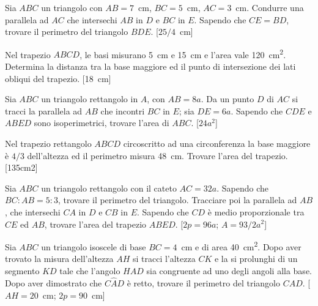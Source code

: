 \begin{multicols}{2}

\begin{esercizio}
\label{ese:7.10}
Sia $ABC$ un triangolo con $AB=7$~cm, $BC=5$~cm, $AC=3$~cm. Condurre una parallela ad $AC$ che intersechi $AB$ in $D$ e $BC$ in $E$. Sapendo che $CE=BD$, trovare il perimetro del triangolo $BDE$. 	[$25/4$~cm]
\end{esercizio}

\begin{esercizio}
\label{ese:7.11}
Nel trapezio $ABCD$, le basi misurano 5~cm e 15~cm e l'area vale 120~cm\textsuperscript{2}. Determina la distanza tra la base maggiore ed il punto di intersezione dei lati obliqui del trapezio. 		[18~cm]
\end{esercizio}

\begin{esercizio}
\label{ese:7.12}
Sia $ABC$ un triangolo rettangolo in $A$, con $AB=8a$. Da un punto $D$ di $AC$ si tracci la parallela ad $AB$ che incontri $BC$ in $E$; sia $DE=6a$. Sapendo che $CDE$ e $ABED$ sono isoperimetrici, trovare l'area di $ABC$.   [$24a^2$]
\end{esercizio}

\begin{esercizio}
\label{ese:7.13}
Nel trapezio rettangolo $ABCD$ circoscritto ad una circonferenza  la base maggiore è $4/3$ dell'altezza ed il perimetro misura 48~cm. Trovare l'area del trapezio.              		[135cm2]
\end{esercizio}

\begin{esercizio}
\label{ese:7.14}
Sia $ABC$ un triangolo rettangolo con il cateto $AC = 32a$. Sapendo che $BC:AB=5:3$, trovare il perimetro del triangolo. Tracciare poi la parallela ad $AB$, che intersechi $CA$ in $D$ e $CB$ in $E$. Sapendo che $CD$ è medio proporzionale tra $CE$ ed $AB$, trovare l'area del trapezio $ABED$. 	[$2p=96a$; $A=93/2a^2$]
\end{esercizio}

\begin{esercizio}
\label{ese:7.15}
Sia $ABC$ un triangolo isoscele di base $BC=4$~cm e di area 40~cm\textsuperscript{2}. Dopo aver trovato la misura dell'altezza $AH$ si tracci l'altezza $CK$ e la si prolunghi di un segmento $KD$ tale che l'angolo $H\widehat{A}D$ sia congruente ad uno degli angoli alla base. Dopo aver dimostrato che $C\widehat{A}D$ è retto, trovare il perimetro del triangolo $CAD$. [$AH=20$~cm; $2p=90$~cm]
\end{esercizio}


\end{multicols}
